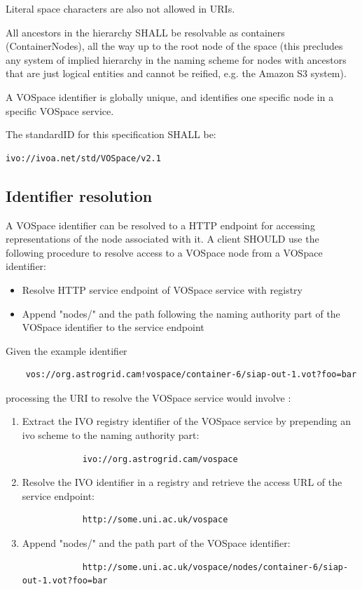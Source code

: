 \documentclass[11pt,a4paper]{ivoa}
\begin{document}
Literal space characters are also not allowed in URIs.

All ancestors in the hierarchy SHALL be resolvable as containers (ContainerNodes), all the way up to the root node of the space (this precludes any system of implied hierarchy in the naming scheme for nodes with ancestors that are just logical entities and cannot be reified, e.g. the Amazon S3 system).

A VOSpace identifier is globally unique, and identifies one specific node in a specific VOSpace service.

The standardID for this specification SHALL be:
\begin{verbatim}
ivo://ivoa.net/std/VOSpace/v2.1
\end{verbatim}

\subsection{Identifier resolution}
\label{subsec:identifier resolution}
A VOSpace identifier can be resolved to a HTTP endpoint for accessing representations of the node associated with it. A client SHOULD use the following procedure to resolve access to a VOSpace node from a VOSpace identifier:

\begin{itemize}
    \item Resolve HTTP service endpoint of VOSpace service with registry
    \item Append "nodes/" and the path following the naming authority part of the VOSpace identifier to the service endpoint
\end{itemize}

Given the example identifier

\begin{verbatim}
    vos://org.astrogrid.cam!vospace/container-6/siap-out-1.vot?foo=bar
\end{verbatim}

processing the URI to resolve the VOSpace service would involve :

\begin{enumerate}
    \item Extract the IVO registry identifier of the VOSpace service by prepending an ivo scheme to the naming authority part:
        \begin{verbatim}
            ivo://org.astrogrid.cam/vospace
        \end{verbatim}
    \item Resolve the IVO identifier in a registry and retrieve the access URL of the service endpoint:
        \begin{verbatim}
            http://some.uni.ac.uk/vospace
        \end{verbatim}
    \item Append "nodes/" and the path part of the VOSpace identifier:
        \begin{verbatim}
            http://some.uni.ac.uk/vospace/nodes/container-6/siap-out-1.vot?foo=bar
        \end{verbatim}
\end{enumerate}
\end{document}
